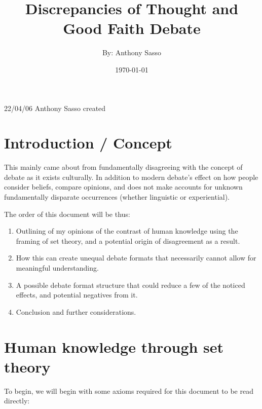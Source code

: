 \documentclass{article}
\title          {\Huge Discrepancies of Thought and Good Faith Debate}
\author         {By: Anthony Sasso}
\date           {\today}
\begin{document}
    
    \maketitle

    \begin{versionhistory}
           {22/04/06}      {Anthony Sasso} {created}
    \end{versionhistory}

    \tableofcontents

    \newpage
    \section{Introduction / Concept}
       This mainly came about from fundamentally disagreeing with the concept of debate as it exists culturally. In addition to modern debate's effect on how people consider beliefs, compare opinions, and does not make accounts for unknown fundamentally disparate occurrences (whether linguistic or experiential).

    \bigskip
        The order of this document will be thus:

    \begin{enumerate}
        \item Outlining of my opinions of the contrast of human knowledge using the framing of set theory, and a potential origin of disagreement as a result.

        \item How this can create unequal debate formats that necessarily cannot allow for meaningful understanding.
        
        \item A possible debate format structure that could reduce a few of the noticed effects, and potential negatives from it.
        
        \item Conclusion and further considerations.
    \end{enumerate}
    
    \section{Human knowledge through set theory}
        To begin, we will begin with some axioms required for this document to be read directly:
    
\end{document}
